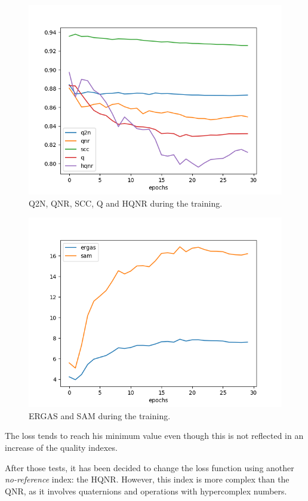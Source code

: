 \documentclass[12pt]{report}
\begin{document}
\begin{figure}
    \centering
    \includegraphics[scale=.7]{qnr2.png}
    \caption{Q2N, QNR, SCC, Q and HQNR during the training.}
    \label{fig:qnr2}
\end{figure}


\begin{figure}
    \centering
    \includegraphics[scale=.7]{qnr3.png}
    \caption{ERGAS and SAM during the training.}
    \label{fig:qnr3}
\end{figure}

The loss tends to reach his minimum value even though this is not reflected in an increase of the quality indexes. 

After those tests, it has been decided to change the loss function using another \textit{no-reference} index: the HQNR.
However, this index is more complex than the QNR, as it involves quaternions and operations with hypercomplex numbers.
\end{document}
